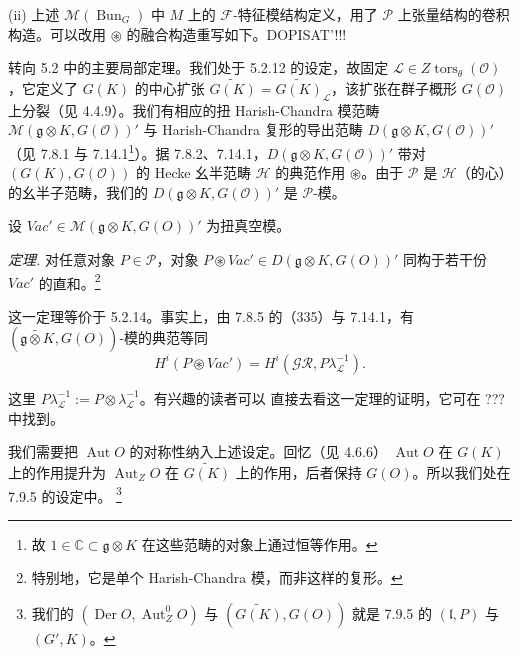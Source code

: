 (ii) 上述 $\mathcal{M}(\operatorname{Bun}_G)$ 中 $M$ 上的 $\mathcal{F}$-特征模结构定义，用了 $\mathcal{P}$ 上张量结构的卷积构造。可以改用 $\circledast$ 的融合构造重写如下。DOPISAT'!!!

 转向 5.2 中的主要局部定理。我们处于 5.2.12 的设定，故固定 $\mathcal{L}\in Z\operatorname{tors}_{\theta}(\mathcal{O})$，它定义了 $G(K)$ 的中心扩张 $\widetilde{G(K)}=\widetilde{G(K)}_{\mathcal{L}}$，该扩张在群子概形 $G(\mathcal{O})$ 上分裂（见 4.4.9）。我们有相应的扭 Harish-Chandra 模范畴 $\mathcal{M}(\mathfrak{g}\otimes K,G(\mathcal{O}))'$ 与 Harish-Chandra 复形的导出范畴 $D(\mathfrak{g}\otimes K,G(\mathcal{O}))'$（见 7.8.1 与 7.14.1\footnote{故 $1\in\mathbb{C}\subset\mathfrak{g}\otimes K$ 在这些范畴的对象上通过恒等作用。}）。据 7.8.2、7.14.1，$D(\mathfrak{g}\otimes K,G(\mathcal{O}))'$ 带对 $(G(K),G(\mathcal{O}))$ 的 Hecke 幺半范畴 $\mathcal{H}$ 的典范作用 $\circledast$。由于 $\mathcal{P}$ 是 $\mathcal{H}$（的心）的幺半子范畴，我们的 $D(\mathfrak{g}\otimes K,G(\mathcal{O}))'$ 是 $\mathcal{P}$-模。



设 $\mathit{Vac}'\in\mathcal{M}(\mathfrak{g}\otimes K,G(O))'$ 为扭真空模。

 \emph{定理.} 对任意对象 $P\in\mathcal{P}$，对象
$P\circledast\mathit{Vac}'\in D(\mathfrak{g}\otimes K,G(O))'$ 同构于若干份
$\mathit{Vac}'$ 的直和。\footnote{特别地，它是单个 Harish-Chandra 模，而非这样的复形。}

这一定理等价于 5.2.14。事实上，由 7.8.5 的（335）与 7.14.1，有
$(\widetilde{\mathfrak{g}\otimes K},G(O))$-模的典范等同
\begin{equation}\tag{282}
H^{i}(P\circledast\mathit{Vac}')=H^{i}(\mathcal{GR},P\lambda_{\mathcal{L}}^{-1}).
\end{equation}

这里 $P\lambda_{\mathcal{L}}^{-1}:=P\otimes\lambda_{\mathcal{L}}^{-1}$。有兴趣的读者可以
直接去看这一定理的证明，它可在 ??? 中找到。

 我们需要把 $\operatorname{Aut}O$ 的对称性纳入上述设定。回忆（见 4.6.6）
$\operatorname{Aut}O$ 在 $G(K)$ 上的作用提升为 $\operatorname{Aut}_ZO$ 在
$\widetilde{G(K)}$ 上的作用，后者保持 $G(O)$。所以我们处在 7.9.5 的设定中。
\footnote{我们的 $(\operatorname{Der}O,\operatorname{Aut}^{0}_{Z}O)$ 与
$(\widetilde{G(K)},G(O))$ 就是 7.9.5 的 $(\mathfrak{l},P)$ 与 $(G',K)$。}

